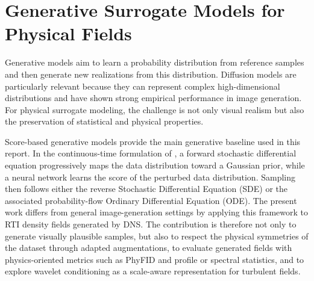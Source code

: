 \section{Generative Surrogate Models for Physical Fields}

Generative models aim to learn a probability distribution from reference samples and then generate new realizations from this distribution. Diffusion models are particularly relevant because they can represent complex high-dimensional distributions and have shown strong empirical performance in image generation. For physical surrogate modeling, the challenge is not only visual realism but also the preservation of statistical and physical properties.

Score-based generative models provide the main generative baseline used in
this report. In the continuous-time formulation of \citet{Song2021SDE}, a
forward stochastic differential equation progressively maps the data
distribution toward a Gaussian prior, while a neural network learns the score
of the perturbed data distribution. Sampling then follows either the reverse Stochastic Differential Equation
(SDE) or the associated probability-flow Ordinary Differential Equation (ODE). The present work differs from
general image-generation settings by applying this framework to RTI density
fields generated by DNS. The contribution is therefore not only to generate
visually plausible samples, but also to respect the physical symmetries of the
dataset through adapted augmentations, to evaluate generated fields with
physics-oriented metrics such as PhyFID and profile or spectral statistics, and
to explore wavelet conditioning as a scale-aware representation for turbulent
fields.
